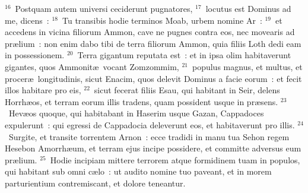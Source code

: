 ${}^{16}$~Postquam autem universi ceciderunt pugnatores,
${}^{17}$~locutus est Dominus ad me, dicens~:
${}^{18}$~Tu transibis hodie terminos Moab, urbem nomine Ar~:
${}^{19}$~et accedens in vicina filiorum Ammon, cave ne pugnes contra eos, nec movearis ad pr\ae lium~: non enim dabo tibi de terra filiorum Ammon, quia filiis Loth dedi eam in possessionem.
${}^{20}$~Terra gigantum reputata est~: et in ipsa olim habitaverunt gigantes, quos Ammonit\ae\ vocant Zomzommim,
${}^{21}$~populus magnus, et multus, et procer\ae\ longitudinis, sicut Enacim, quos delevit Dominus a facie eorum~: et fecit illos habitare pro eis,
${}^{22}$~sicut fecerat filiis Esau, qui habitant in Seir, delens Horrh\ae os, et terram eorum illis tradens, quam possident usque in pr\ae sens.
${}^{23}$~Hev\ae os quoque, qui habitabant in Haserim usque Gazan, Cappadoces expulerunt~: qui egressi de Cappadocia deleverunt eos, et habitaverunt pro illis.
${}^{24}$~Surgite, et transite torrentem Arnon~: ecce tradidi in manu tua Sehon regem Hesebon Amorrh\ae um, et terram ejus incipe possidere, et committe adversus eum pr\ae lium.
${}^{25}$~Hodie incipiam mittere terrorem atque formidinem tuam in populos, qui habitant sub omni c\ae lo~: ut audito nomine tuo paveant, et in morem parturientium contremiscant, et dolore teneantur.


